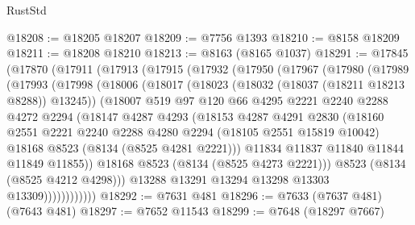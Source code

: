 \begin{lexlean}{RustStd}
\begin{coremodule}
@18208 := @18205 @18207
@18209 := @7756 @1393
@18210 := @8158 @18209
@18211 := @18208 @18210
@18213 := @8163 (@8165 @1037)
@18291 := @17845
    (@17870
      (@17911
        (@17913
          (@17915
            (@17932
              (@17950
                (@17967
                  (@17980
                    (@17989
                      (@17993
                        (@17998
                          (@18006
                            (@18017
                              (@18023 (@18032 (@18037 (@18211 @18213 @8288)) @13245))
                              (@18007
                                @519
                                @97
                                @120
                                @66
                                @4295
                                @2221
                                @2240
                                @2288
                                @4272
                                @2294
                                (@18147
                                  @4287
                                  @4293
                                  (@18153
                                    @4287
                                    @4291
                                    @2830
                                    (@18160
                                      @2551
                                      @2221
                                      @2240
                                      @2288
                                      @4280
                                      @2294
                                      (@18105 @2551 @15819 @10042)
                                      @18168
                                      @8523
                                      (@8134 (@8525 @4281 @2221)))
                                    @11834
                                    @11837
                                    @11840
                                    @11844
                                    @11849
                                    @11855))
                                @18168
                                @8523
                                (@8134 (@8525 @4273 @2221)))
                              @8523
                              (@8134 (@8525 @4212 @4298)))
                            @13288
                            @13291
                            @13294
                            @13298
                            @13303
                            @13309))))))))))))
@18292 := @7631 @481
@18296 := @7633 (@7637 @481) (@7643 @481)
@18297 := @7652 @11543
@18299 := @7648 (@18297 @7667)

\end{coremodule}
\end{lexlean}
